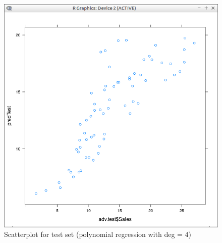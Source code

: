 \documentclass[10pt,a4paper]{article}
\begin{document}
\begin{figure}[H]
\centering
\includegraphics[width=140mm]{figures2/pltTe4.png}
\caption{Scatterplot for test set (polynomial regression with deg = 4) \label{overflow}}
\end{figure}
\end{document}
